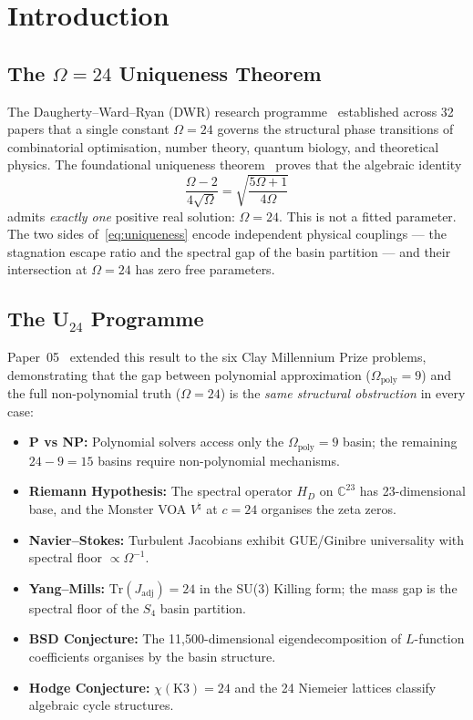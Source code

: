 \documentclass[11pt,a4paper]{article}
\begin{document}
\section{Introduction}\label{sec:intro}

\subsection{The $\Omega = 24$ Uniqueness Theorem}

The Daugherty--Ward--Ryan (DWR) research programme~\cite{dwr_papers} established across 32 papers that a single constant $\Omega = 24$ governs the structural phase transitions of combinatorial optimisation, number theory, quantum biology, and theoretical physics.
The foundational uniqueness theorem~\cite{omega24} proves that the algebraic identity
\begin{equation}\label{eq:uniqueness}
\frac{\Omega - 2}{4\sqrt{\Omega}} = \sqrt{\frac{5\Omega + 1}{4\Omega}}
\end{equation}
admits \emph{exactly one} positive real solution: $\Omega = 24$.
This is not a fitted parameter.
The two sides of~\eqref{eq:uniqueness} encode independent physical couplings --- the stagnation escape ratio and the spectral gap of the basin partition --- and their intersection at $\Omega = 24$ has zero free parameters.

\subsection{The U$_{24}$ Programme}

Paper~05~\cite{u24} extended this result to the six Clay Millennium Prize problems, demonstrating that the gap between polynomial approximation ($\Omega_{\mathrm{poly}} = 9$) and the full non-polynomial truth ($\Omega = 24$) is the \emph{same structural obstruction} in every case:
\begin{itemize}[nosep]
\item \textbf{P vs NP:} Polynomial solvers access only the $\Omega_{\mathrm{poly}} = 9$ basin; the remaining $24 - 9 = 15$ basins require non-polynomial mechanisms.
\item \textbf{Riemann Hypothesis:} The spectral operator $H_D$ on $\mathbb{C}^{23}$ has 23-dimensional base, and the Monster VOA $V^\natural$ at $c = 24$ organises the zeta zeros.
\item \textbf{Navier--Stokes:} Turbulent Jacobians exhibit GUE/Ginibre universality with spectral floor $\propto \Omega^{-1}$.
\item \textbf{Yang--Mills:} $\mathrm{Tr}(J_{\mathrm{adj}}) = 24$ in the SU(3) Killing form; the mass gap is the spectral floor of the $S_4$ basin partition.
\item \textbf{BSD Conjecture:} The 11{,}500-dimensional eigendecomposition of $L$-function coefficients organises by the basin structure.
\item \textbf{Hodge Conjecture:} $\chi(\mathrm{K3}) = 24$ and the 24 Niemeier lattices classify algebraic cycle structures.
\end{itemize}
\end{document}
